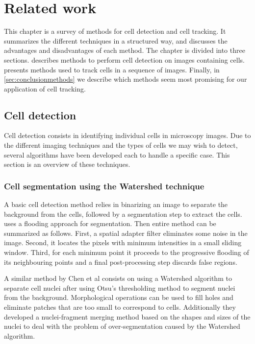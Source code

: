 \chapter{Related work }
\label{chap:relatedwork}
This chapter is a survey of methods for cell detection and cell tracking. It summarizes the different techniques in a structured way, and discusses the advantages and disadvantages of each method. The chapter is divided into three sections.  describes methods to perform cell detection on images containing cells.  presents methods used to track cells in a sequence of images. Finally, in \cref{sec:conclusionmethods} we describe which methods seem most promising for our application of cell tracking. 
	

\section{Cell detection}
\label{sec:detection}
\label{sec:relatedworkdetection}

Cell detection consists in identifying individual cells in microscopy images. Due to the different imaging techniques and the types of cells we may wish to detect, several algorithms have been developed each to handle a specific case. This section is an overview of these techniques.

\subsection{Cell segmentation using the Watershed technique}

A basic cell detection method relies in binarizing an image to separate the background from the cells, followed by a segmentation step to extract the cells. \cite{chen99} uses a flooding approach for segmentation. Then entire method can be summarized as follows. First, a spatial adapter filter eliminates some noise in the image. Second, it locates the pixels with minimum intensities in a small sliding window. Third, for each minimum point it proceeds to the progressive flooding of its neighbouring points and a final post-processing step discards false regions.

A similar method by Chen et al \cite{chen06} consists on using a Watershed algorithm \cite{vincent93} to separate cell nuclei after using Otsu's thresholding method to segment nuclei from the background. Morphological operations \cite{serra83} can be used to fill holes and eliminate patches that are too small to correspond to cells. Additionally they developed a nuclei-fragment merging method based on the shapes and sizes of the nuclei to deal with the problem of over-segmentation caused by the Watershed algorithm.

